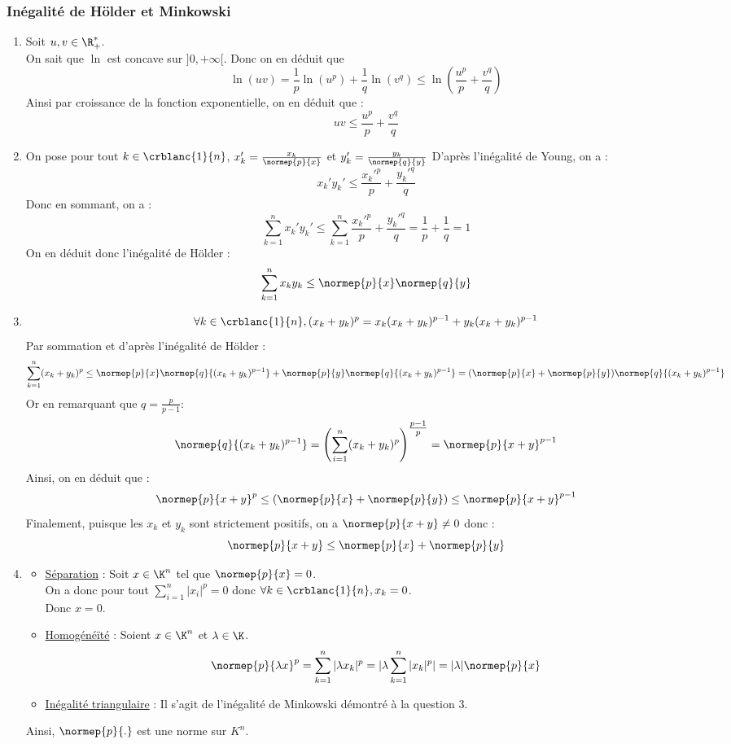 \documentclass{book}
\begin{document}
	\subsubsection{Inégalité de Hölder et Minkowski}
	\begin{enumerate}[leftmargin=*]
		\item Soit $u,v\in \R^*_+$.\\
		On sait que $\ln$ est concave sur $]0,+\infty[$. Donc on en déduit que 
		\[
		\ln(uv)=\frac{1}{p}\ln(u^p)+\frac{1}{q}\ln(v^q)\leq\ln\left(\frac{u^p}{p}+\frac{v^q}{q}\right)
		\]
		Ainsi par croissance de la fonction exponentielle, on en déduit que :
		\[
		uv\leq \frac{u^p}{p}+\frac{v^q}{q}
		\]
		\item On pose pour tout $k\in\crblanc{1}{n}$, $x_k'=\frac{x_k}{\normep{p}{x}}$ et $y_k'=\frac{y_k}{\normep{q}{y}}$
		D'après l'inégalité de Young, on a : 
		\[
		x_k'y_k'\leq \frac{x_k'^p}{p}+\frac{y_k'^q}{q}
		\]
		Donc en sommant, on a :
		\[
		\sum_{k=1}^{n}x_k'y_k'\leq \sum_{k=1}^{n}\frac{x_k'^p}{p}+\frac{y_k'^q}{q}=\frac{1}{p}+\frac{1}{q}=1
		\]
		On en déduit donc l'inégalité de Hölder :
		\[
		\sum_{k=1}^{n}x_ky_k\leq \normep{p}{x}\normep{q}{y}
		\]
		\item \[\forall k\in\crblanc{1}{n}, (x_k+y_k)^p=x_k(x_k+y_k)^{p-1}+y_k(x_k+y_k)^{p-1}\]
		Par sommation et d'après l'inégalité de Hölder :\[
		\sum_{k=1}^{n}(x_k+y_k)^p\leq \normep{p}{x}\normep{q}{(x_k+y_k)^{p-1}}+\normep{p}{y}\normep{q}{(x_k+y_k)^{p-1}}=(\normep{p}{x}+\normep{p}{y})\normep{q}{(x_k+y_k)^{p-1}}
		\]
		Or en remarquant que $q=\frac{p}{p-1}$:\[\normep{q}{(x_k+y_k)^{p-1}}=\left(\sum_{i=1}^{n}(x_k+y_k)^p\right)^{\tfrac{p-1}{p}}=\normep{p}{x+y}^{p-1}\]
		Ainsi, on en déduit que :\[\normep{p}{x+y}^p\leq(\normep{p}{x}+\normep{p}{y})\leq\normep{p}{x+y}^{p-1}\]
		Finalement, puisque les $x_k$ et $y_k$ sont strictement positifs, on a $\normep{p}{x+y}\ne0$ donc : \[\normep{p}{x+y}\leq\normep{p}{x}+\normep{p}{y}\]
		\item 
		\begin{itemize}
		\item \underline{Séparation} : Soit $x\in\K^n$ tel que $\normep{p}{x}=0$.\\
		On a donc pour tout $\sum_{i=1}^{n}|x_i|^p=0$ donc $\forall k\in\crblanc{1}{n}, x_k=0$.\\
		Donc $x=0$.
		\item\underline{Homogénéïté} : Soient $x\in\K^n$ et $\lambda\in\K$.\\
		$$\normep{p}{\lambda x}^p=\sum_{k=1}^{n}|\lambda x_k|^p=|\lambda\sum_{k=1}^{n}| x_k|^p|=|\lambda|\normep{p}{x}$$
		\item\underline{Inégalité triangulaire} : Il s'agit de l'inégalité de Minkowski démontré à la question 3.
	\end{itemize}
		Ainsi, $\normep{p}{.}$ est une norme sur $K^n$.
	\end{enumerate}
\end{document}
